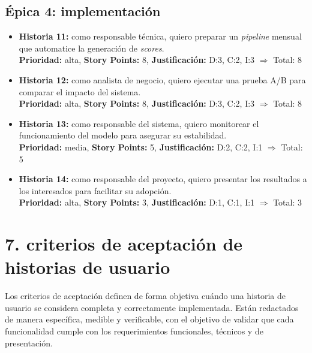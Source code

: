 \documentclass[
11pt, %
]{charter}
\begin{document}
\subsection*{\'Epica 4: implementación}
\begin{itemize}
  \item \textbf{Historia 11:} como responsable técnica, quiero preparar un \textit{pipeline} mensual que automatice la generación de \textit{scores}.\\
  \textbf{Prioridad:} alta, \textbf{Story Points:} 8, \textbf{Justificación:} D:3, C:2, I:3 $\Rightarrow$ Total: 8

  \item \textbf{Historia 12:} como analista de negocio, quiero ejecutar una prueba A/B para comparar el impacto del sistema.\\
  \textbf{Prioridad:} alta, \textbf{Story Points:} 8, \textbf{Justificación:} D:3, C:2, I:3 $\Rightarrow$ Total: 8

  \item \textbf{Historia 13:} como responsable del sistema, quiero monitorear el funcionamiento del modelo para asegurar su estabilidad.\\
  \textbf{Prioridad:} media, \textbf{Story Points:} 5, \textbf{Justificación:} D:2, C:2, I:1 $\Rightarrow$ Total: 5

  \item \textbf{Historia 14:} como responsable del proyecto, quiero presentar los resultados a los interesados para facilitar su adopción.\\
  \textbf{Prioridad:} alta, \textbf{Story Points:} 3, \textbf{Justificación:} D:1, C:1, I:1 $\Rightarrow$ Total: 3
\end{itemize}

\section{7. criterios de aceptación de historias de usuario}
\label{sec:criteriosAceptacion}

Los criterios de aceptación definen de forma objetiva cuándo una historia de usuario se considera completa y correctamente implementada. Están redactados de manera específica, medible y verificable, con el objetivo de validar que cada funcionalidad cumple con los requerimientos funcionales, técnicos y de presentación.
\end{document}
